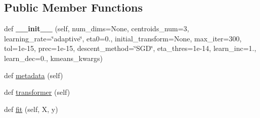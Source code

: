 \subsection*{Public Member Functions}
\begin{DoxyCompactItemize}
\item 
def {\bfseries \+\_\+\+\_\+init\+\_\+\+\_\+} (self, num\+\_\+dims=None, centroids\+\_\+num=3, learning\+\_\+rate=\char`\"{}adaptive\char`\"{}, eta0=0., initial\+\_\+transform=None, max\+\_\+iter=300, tol=1e-\/15, prec=1e-\/15, descent\+\_\+method=\char`\"{}\+S\+G\+D\char`\"{}, eta\+\_\+thres=1e-\/14, learn\+\_\+inc=1., learn\+\_\+dec=0., kmeans\+\_\+kwargs)\hypertarget{classdml_1_1ncmc_1_1NCMC_a905f1d40b974485150080efa24733d5e}{}\label{classdml_1_1ncmc_1_1NCMC_a905f1d40b974485150080efa24733d5e}

\item 
def \hyperlink{classdml_1_1ncmc_1_1NCMC_a4d5a73df974b062e4f4d2f541e473a25}{metadata} (self)
\item 
def \hyperlink{classdml_1_1ncmc_1_1NCMC_a2744b247a6e0afba68ffe9ed51da5ad5}{transformer} (self)
\item 
def \hyperlink{classdml_1_1ncmc_1_1NCMC_a628e2c403fff6e06d8c7fcc24dd23440}{fit} (self, X, y)
\end{DoxyCompactItemize}
